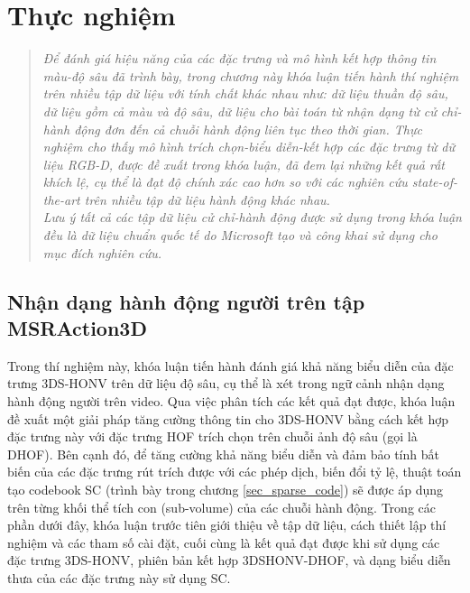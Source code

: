 \chapter{Thực nghiệm}
\ifpdf
    \graphicspath{{Chapter5/Chapter5Figs/PNG/}{Chapter5/Chapter5Figs/PDF/}{Chapter5/Chapter5Figs/}}
\else
    \graphicspath{{Chapter5/Chapter5Figs/EPS/}{Chapter5/Chapter5Figs/}}
\fi
\label{chap_5}

\begin{quote}
\textit{Để đánh giá hiệu năng của các đặc trưng và mô hình kết hợp thông tin màu-độ sâu đã trình bày, trong chương này khóa luận tiến hành thí nghiệm trên nhiều tập dữ liệu với tính chất khác nhau như: dữ liệu thuần độ sâu, dữ liệu gồm cả màu và độ sâu, dữ liệu cho bài toán từ nhận dạng từ cử chỉ-hành động đơn đến cả chuỗi hành động liên tục theo thời gian. Thực nghiệm cho thấy mô hình trích chọn-biểu diễn-kết hợp các đặc trưng từ dữ liệu RGB-D, được đề xuất trong khóa luận, đã đem lại những kết quả rất khích lệ, cụ thể là đạt độ chính xác cao hơn so với các nghiên cứu state-of-the-art trên nhiều tập dữ liệu hành động khác nhau.}\\
\textit{Lưu ý tất cả các tập dữ liệu cử chỉ-hành động được sử dụng trong khóa luận đều là dữ liệu chuẩn quốc tế do Microsoft tạo  và công khai sử dụng cho mục đích nghiên cứu.}
\end{quote}

\section{Nhận dạng hành động người trên tập MSRAction3D\cite{Wu_LOP2012}}
\label{sec_action3d_exp}
Trong thí nghiệm này, khóa luận tiến hành đánh giá khả năng biểu diễn của đặc trưng 3DS-HONV trên dữ liệu độ sâu, cụ thể là xét trong ngữ cảnh nhận dạng hành động người trên video. Qua việc phân tích các kết quả đạt được, khóa luận đề xuất một giải pháp tăng cường thông tin cho 3DS-HONV bằng cách kết hợp đặc trưng này với đặc trưng HOF trích chọn trên chuỗi ảnh độ sâu (gọi là DHOF). Bên cạnh đó, để tăng cường khả năng biểu diễn và đảm bảo tính bất biến của các đặc trưng rút trích được với các phép dịch, biến đổi tỷ lệ, thuật toán tạo codebook SC (trình bày trong chương \ref{sec_sparse_code}) sẽ được áp dụng trên từng khối thể tích con (sub-volume) của các chuỗi hành động. Trong các phần dưới đây, khóa luận trước tiên giới thiệu về tập dữ liệu, cách thiết lập thí nghiệm và các tham số cài đặt, cuối cùng là kết quả đạt được khi sử dụng các đặc trưng 3DS-HONV, phiên bản kết hợp 3DSHONV-DHOF, và dạng biểu diễn thưa của các đặc trưng này sử dụng SC. 
